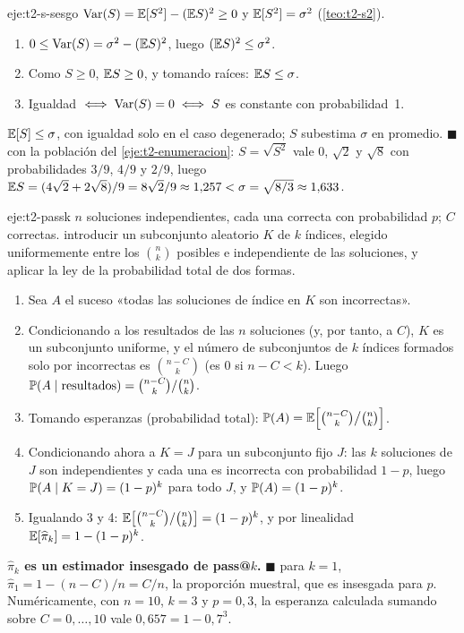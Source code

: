 \begin{solucion}{eje:t2-s-sesgo}
\planteamiento $\operatorname{Var}(S)=\mathbb{E}[S^{2}]-(\mathbb{E} S)^{2}\ge0$ y $\mathbb{E}[S^{2}]=\sigma^{2}$ (\cref{teo:t2-s2}).
\pasos
\begin{enumerate}[label=\arabic*.]
  \item $0\le\operatorname{Var}(S)=\sigma^{2}-(\mathbb{E} S)^{2}$, luego $(\mathbb{E} S)^{2}\le\sigma^{2}$.
  \item Como $S\ge0$, $\mathbb{E} S\ge0$, y tomando raíces: $\mathbb{E} S\le\sigma$.
  \item Igualdad $\iff\operatorname{Var}(S)=0\iff S$ es constante con probabilidad~1.
\end{enumerate}
\resultado \textbf{$\mathbb{E}[S]\le\sigma$}, con igualdad solo en el caso degenerado; $S$ subestima $\sigma$ en promedio. $\blacksquare$
\comprobacion con la población del \cref{eje:t2-enumeracion}: $S=\sqrt{S^{2}}$ vale $0$, $\sqrt2$ y $\sqrt8$ con probabilidades $3/9$, $4/9$ y $2/9$, luego $\mathbb{E} S=(4\sqrt2+2\sqrt8)/9=8\sqrt2/9\approx1{,}257<\sigma=\sqrt{8/3}\approx1{,}633$.
\end{solucion}

\begin{solucion}{eje:t2-passk}
\datos $n$ soluciones independientes, cada una correcta con probabilidad $p$; $C$ correctas.
\planteamiento introducir un subconjunto aleatorio $K$ de $k$ índices, elegido uniformemente entre los $\binom nk$ posibles e independiente de las soluciones, y aplicar la ley de la probabilidad total de dos formas.
\pasos
\begin{enumerate}[label=\arabic*.]
  \item Sea $A$ el suceso «todas las soluciones de índice en $K$ son incorrectas».
  \item Condicionando a los resultados de las $n$ soluciones (y, por tanto, a $C$), $K$ es un subconjunto uniforme, y el número de subconjuntos de $k$ índices formados solo por incorrectas es $\binom{n-C}{k}$ (es $0$ si $n-C<k$). Luego $\mathbb{P}(A\mid\text{resultados})=\binom{n-C}{k}/\binom nk$.
  \item Tomando esperanzas (probabilidad total): $\mathbb{P}(A)=\mathbb{E}\Bigl[\binom{n-C}{k}\big/\binom nk\Bigr]$.
  \item Condicionando ahora a $K=J$ para un subconjunto fijo $J$: las $k$ soluciones de $J$ son independientes y cada una es incorrecta con probabilidad $1-p$, luego $\mathbb{P}(A\mid K=J)=(1-p)^{k}$ para todo $J$, y $\mathbb{P}(A)=(1-p)^{k}$.
  \item Igualando 3 y 4: $\mathbb{E}\bigl[\binom{n-C}{k}/\binom nk\bigr]=(1-p)^{k}$, y por linealidad $\mathbb{E}[\widehat\pi_k]=1-(1-p)^{k}$.
\end{enumerate}
\resultado \textbf{$\widehat\pi_k$ es un estimador insesgado de pass@$k$.} $\blacksquare$
\comprobacion para $k=1$, $\widehat\pi_1=1-(n-C)/n=C/n$, la proporción muestral, que es insesgada para $p$. Numéricamente, con $n=10$, $k=3$ y $p=0{,}3$, la esperanza calculada sumando sobre $C=0,\dots,10$ vale $0{,}657=1-0{,}7^{3}$.
\end{solucion}

